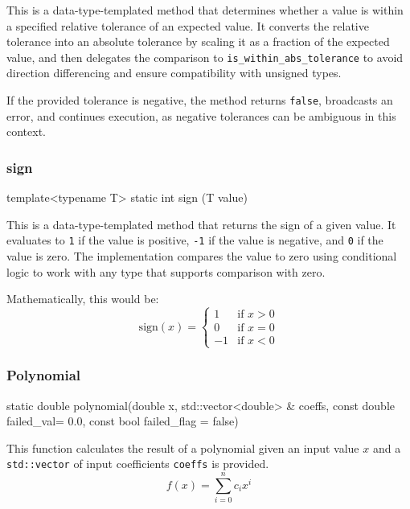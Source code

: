 \documentclass[11pt,fleqn]{report}
\begin{document}
This is a data-type-templated method that determines whether a value is within
a specified relative tolerance of an expected value. It converts the relative
tolerance into an absolute tolerance by scaling it as a fraction of the 
expected value, and then delegates the comparison to \texttt{is\_within\_abs\_tolerance}
to avoid direction differencing and ensure compatibility with unsigned types.

If the provided tolerance is negative, the method returns \texttt{false}, 
broadcasts an error, and continues execution, as negative tolerances can be 
ambiguous in this context.

\subsubsection{sign}
\begin{code}
template<typename T>
static int sign (T value)
\end{code}

This is a data-type-templated method that returns the sign of a given value. It 
evaluates to \texttt{1} if the value is positive, \texttt{-1} if the value is negative, 
and \texttt{0} if the value is zero. The implementation compares the value to zero
using conditional logic to work with any type that supports comparison with zero.

Mathematically, this would be:
\[
\text{sign}(x) = 
\begin{cases}
1 & \text{if } x > 0 \\
0 & \text{if } x = 0 \\
 -1 & \text{if } x < 0
\end{cases}
\]

\subsubsection{Polynomial}
\begin{code}
static double polynomial(double x,
                         std::vector<double> & coeffs,
                         const double failed_val= 0.0,
                         const bool failed_flag = false)
\end{code}

This function calculates the result of a polynomial given an input value $x$
and a \texttt{std::vector} of input coefficients \texttt{coeffs} is provided.
\begin{equation*}
f(x) = \sum_{i=0}^{n} c_i x^i
\end{equation*}
\end{document}
